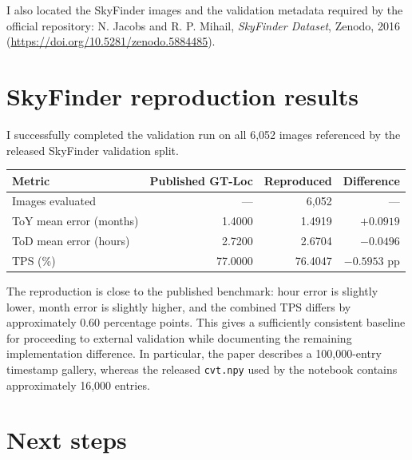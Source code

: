 \documentclass[10pt,a4paper]{article}
\begin{document}
I also located the SkyFinder images and the validation metadata required by the official repository:
N. Jacobs and R. P. Mihail, \emph{SkyFinder Dataset}, Zenodo, 2016
(\url{https://doi.org/10.5281/zenodo.5884485}).

\section*{SkyFinder reproduction results}

I successfully completed the validation run on all 6,052 images referenced by the released SkyFinder validation split.

\begin{center}
\small
{}
\begin{tabular}{lrrr}
\toprule
\textbf{Metric} & \textbf{Published GT-Loc} & \textbf{Reproduced} & \textbf{Difference} \\
\midrule
Images evaluated & --- & 6,052 & --- \\
ToY mean error (months) & 1.4000 & 1.4919 & $+0.0919$ \\
ToD mean error (hours) & 2.7200 & 2.6704 & $-0.0496$ \\
TPS (\%) & 77.0000 & 76.4047 & $-0.5953$ pp \\
\bottomrule
\end{tabular}
\end{center}

The reproduction is close to the published benchmark: hour error is slightly lower, month error is slightly higher, and the combined TPS differs by approximately 0.60 percentage points. This gives a sufficiently consistent baseline for proceeding to external validation while documenting the remaining implementation difference. In particular, the paper describes a 100,000-entry timestamp gallery, whereas the released \texttt{cvt.npy} used by the notebook contains approximately 16,000 entries.

\section*{Next steps}
\end{document}
